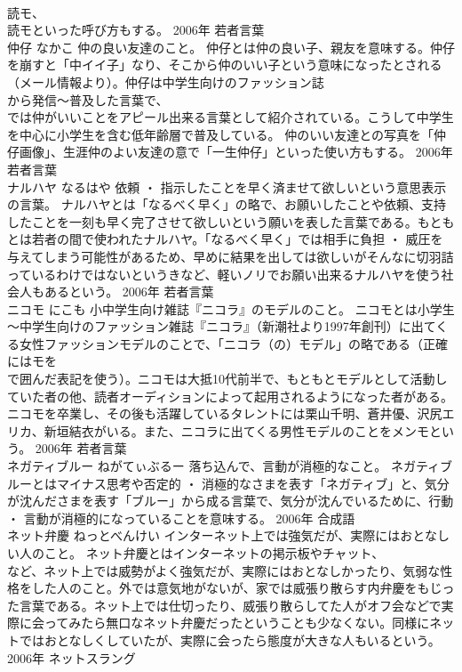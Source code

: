 \documentclass[8pt]{extreport}
\begin{document}
\begin{CJK}{UTF8}{min}
\\	読モ、
\\	読モといった呼び方もする。	2006年	若者言葉	
\\	仲仔	なかこ	仲の良い友達のこと。	仲仔とは仲の良い子、親友を意味する。仲仔を崩すと「中イイ子」なり、そこから仲のいい子という意味になったとされる（メール情報より）。仲仔は中学生向けのファッション誌
\\	から発信～普及した言葉で、
\\	では仲がいいことをアピール出来る言葉として紹介されている。こうして中学生を中心に小学生を含む低年齢層で普及している。 仲のいい友達との写真を「仲仔画像」、生涯仲のよい友達の意で「一生仲仔」といった使い方もする。	2006年	若者言葉	
\\	ナルハヤ	なるはや	依頼 ・ 指示したことを早く済ませて欲しいという意思表示の言葉。	ナルハヤとは「なるべく早く」の略で、お願いしたことや依頼、支持したことを一刻も早く完了させて欲しいという願いを表した言葉である。もともとは若者の間で使われたナルハヤ。「なるべく早く」では相手に負担 ・ 威圧を与えてしまう可能性があるため、早めに結果を出しては欲しいがそんなに切羽詰っているわけではないというきなど、軽いノリでお願い出来るナルハヤを使う社会人もあるという。	2006年	若者言葉	
\\	ニコモ	にこも	小中学生向け雑誌『ニコラ』のモデルのこと。	ニコモとは小学生～中学生向けのファッション雑誌『ニコラ』（新潮社より1997年創刊）に出てくる女性ファッションモデルのことで、「ニコラ（の）モデル」の略である（正確にはモを
\\	で囲んだ表記を使う）。ニコモは大抵10代前半で、もともとモデルとして活動していた者の他、読者オーディションによって起用されるようになった者がある。ニコモを卒業し、その後も活躍しているタレントには栗山千明、蒼井優、沢尻エリカ、新垣結衣がいる。また、ニコラに出てくる男性モデルのことをメンモという。	2006年	若者言葉	
\\	ネガティブルー	ねがてぃぶるー	落ち込んで、言動が消極的なこと。	ネガティブルーとはマイナス思考や否定的 ・ 消極的なさまを表す「ネガティブ」と、気分が沈んださまを表す「ブルー」から成る言葉で、気分が沈んでいるために、行動 ・ 言動が消極的になっていることを意味する。	2006年	合成語	
\\	ネット弁慶	ねっとべんけい	インターネット上では強気だが、実際にはおとなしい人のこと。	ネット弁慶とはインターネットの掲示板やチャット、
\\	など、ネット上では威勢がよく強気だが、実際にはおとなしかったり、気弱な性格をした人のこと。外では意気地がないが、家では威張り散らす内弁慶をもじった言葉である。ネット上では仕切ったり、威張り散らしてた人がオフ会などで実際に会ってみたら無口なネット弁慶だったということも少なくない。同様にネットではおとなしくしていたが、実際に会ったら態度が大きな人もいるという。	2006年	ネットスラング	

\end{CJK}
\end{document}
